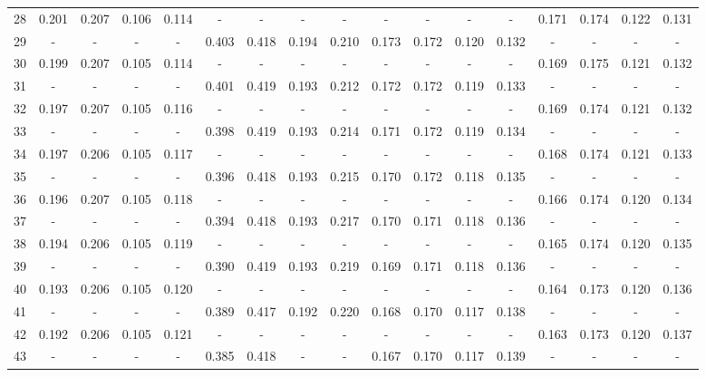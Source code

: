 \documentclass{report}
\begin{document}
\begin{appendices}
\begin{table}
\begin{tabular}{|c|cccc|cccc|cccc|cccc|}
28 & 0.201 & 0.207 & 0.106 & 0.114 &   -   &   -   &   -   &   -   &   -   &   -   &   -   &   -   & 0.171 & 0.174 & 0.122 & 0.131\\
29 &   -   &   -   &   -   &   -   & 0.403 & 0.418 & 0.194 & 0.210 & 0.173 & 0.172 & 0.120 & 0.132 &   -   &   -   &   -   &   -  \\
30 & 0.199 & 0.207 & 0.105 & 0.114 &   -   &   -   &   -   &   -   &   -   &   -   &   -   &   -   & 0.169 & 0.175 & 0.121 & 0.132\\
31 &   -   &   -   &   -   &   -   & 0.401 & 0.419 & 0.193 & 0.212 & 0.172 & 0.172 & 0.119 & 0.133 &   -   &   -   &   -   &   -  \\
32 & 0.197 & 0.207 & 0.105 & 0.116 &   -   &   -   &   -   &   -   &   -   &   -   &   -   &   -   & 0.169 & 0.174 & 0.121 & 0.132\\
33 &   -   &   -   &   -   &   -   & 0.398 & 0.419 & 0.193 & 0.214 & 0.171 & 0.172 & 0.119 & 0.134 &   -   &   -   &   -   &   -  \\
34 & 0.197 & 0.206 & 0.105 & 0.117 &   -   &   -   &   -   &   -   &   -   &   -   &   -   &   -   & 0.168 & 0.174 & 0.121 & 0.133\\
35 &   -   &   -   &   -   &   -   & 0.396 & 0.418 & 0.193 & 0.215 & 0.170 & 0.172 & 0.118 & 0.135 &   -   &   -   &   -   &   -  \\
36 & 0.196 & 0.207 & 0.105 & 0.118 &   -   &   -   &   -   &   -   &   -   &   -   &   -   &   -   & 0.166 & 0.174 & 0.120 & 0.134\\
37 &   -   &   -   &   -   &   -   & 0.394 & 0.418 & 0.193 & 0.217 & 0.170 & 0.171 & 0.118 & 0.136 &   -   &   -   &   -   &   -  \\
38 & 0.194 & 0.206 & 0.105 & 0.119 &   -   &   -   &   -   &   -   &   -   &   -   &   -   &   -   & 0.165 & 0.174 & 0.120 & 0.135\\
39 &   -   &   -   &   -   &   -   & 0.390 & 0.419 & 0.193 & 0.219 & 0.169 & 0.171 & 0.118 & 0.136 &   -   &   -   &   -   &   -  \\
40 & 0.193 & 0.206 & 0.105 & 0.120 &   -   &   -   &   -   &   -   &   -   &   -   &   -   &   -   & 0.164 & 0.173 & 0.120 & 0.136\\
41 &   -   &   -   &   -   &   -   & 0.389 & 0.417 & 0.192 & 0.220 & 0.168 & 0.170 & 0.117 & 0.138 &   -   &   -   &   -   &   -  \\
42 & 0.192 & 0.206 & 0.105 & 0.121 &   -   &   -   &   -   &   -   &   -   &   -   &   -   &   -   & 0.163 & 0.173 & 0.120 & 0.137\\
43 &   -   &   -   &   -   &   -   & 0.385 & 0.418 &   -   &   -   & 0.167 & 0.170 & 0.117 & 0.139 &   -   &   -   &   -   &   -  \\

\end{tabular}
\end{table}
\end{appendices}
\end{document}
